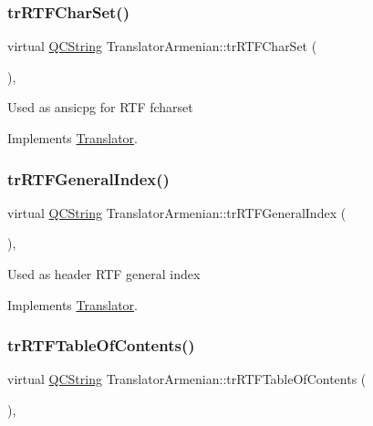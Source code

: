 \subsubsection{\texorpdfstring{trRTFCharSet()}{trRTFCharSet()}}
{\footnotesize\ttfamily virtual \mbox{\hyperlink{class_q_c_string}{Q\+C\+String}} Translator\+Armenian\+::tr\+R\+T\+F\+Char\+Set (\begin{DoxyParamCaption}{ }\end{DoxyParamCaption})\hspace{0.3cm}{\ttfamily [inline]}, {\ttfamily [virtual]}}

Used as ansicpg for R\+TF fcharset 

Implements \mbox{\hyperlink{class_translator_afad391f3cbfb5ce6332b7239f8e2049a}{Translator}}.

\mbox{\label{class_translator_armenian_a1090a2b73bb0d47e5057622a9795ad64}} 
\subsubsection{\texorpdfstring{trRTFGeneralIndex()}{trRTFGeneralIndex()}}
{\footnotesize\ttfamily virtual \mbox{\hyperlink{class_q_c_string}{Q\+C\+String}} Translator\+Armenian\+::tr\+R\+T\+F\+General\+Index (\begin{DoxyParamCaption}{ }\end{DoxyParamCaption})\hspace{0.3cm}{\ttfamily [inline]}, {\ttfamily [virtual]}}

Used as header R\+TF general index 

Implements \mbox{\hyperlink{class_translator}{Translator}}.

\mbox{\label{class_translator_armenian_a6f49a658a234e5e1c8afa2bb6219d340}} 
\subsubsection{\texorpdfstring{trRTFTableOfContents()}{trRTFTableOfContents()}}
{\footnotesize\ttfamily virtual \mbox{\hyperlink{class_q_c_string}{Q\+C\+String}} Translator\+Armenian\+::tr\+R\+T\+F\+Table\+Of\+Contents (\begin{DoxyParamCaption}{ }\end{DoxyParamCaption})\hspace{0.3cm}{\ttfamily [inline]}, {\ttfamily [virtual]}}

